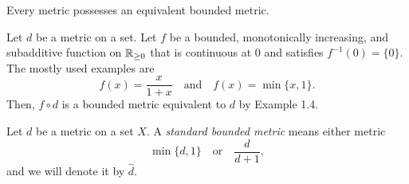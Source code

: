 \documentclass{../../large}
\begin{document}
\begin{prop}
Every metric possesses an equivalent bounded metric.
\end{prop}
\begin{pf}
Let $d$ be a metric on a set.
Let $f$ be a bounded, monotonically increasing, and subadditive function on $\mathbb{R}_{\ge0}$ that is continuous at 0 and satisfies $f^{-1}(0)=\{0\}$.
The mostly used examples are
\[f(x)=\frac x{1+x}\quad\text{and}\quad f(x)=\min\{x,1\}.\]
Then, $f\circ d$ is a bounded metric equivalent to $d$ by Example 1.4.
\end{pf}

\begin{defn}
Let $d$ be a metric on a set $X$.
A \emph{standard bounded metric} means either metric
\[\min\{d,1\}\quad\text{or}\quad\frac d{d+1},\]
and we will denote it by $\hat d$.
\end{defn}
\end{document}
